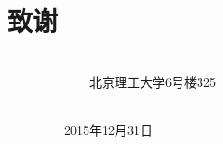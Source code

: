 
\chapter*{致谢}


\ \ \ \ \ \ \ \ \ \ \ \ \ \ \ \ \ \ \ \  \ \ \ \ \ \ \ \ \ \ \ \ \ \ \ \ \ \ \ \   \ \ \ \ \ \ \ \ \ \ \ \ \ \ \ \ \ \ \ \ \ \ \ \ \ \ \ \ \ \ \  \ \ \ \ \ \ \ \ \ \  \ \ \ \ 北京理工大学6号楼325

\ \ \ \ \ \ \ \ \ \ \ \ \ \ \ \ \ \ \ \  \ \ \ \ \ \ \ \ \ \  \ \ \ \ \ \ \ \ \ \  \ \ \ \ \ \ \ \ \ \ \ \ \ \ \ \ \ \ \ \  \ \ \ \ \ \ \ \ \ \  \ \ \ \  \ \ \   \ \ \ \ 2015年12月31日

